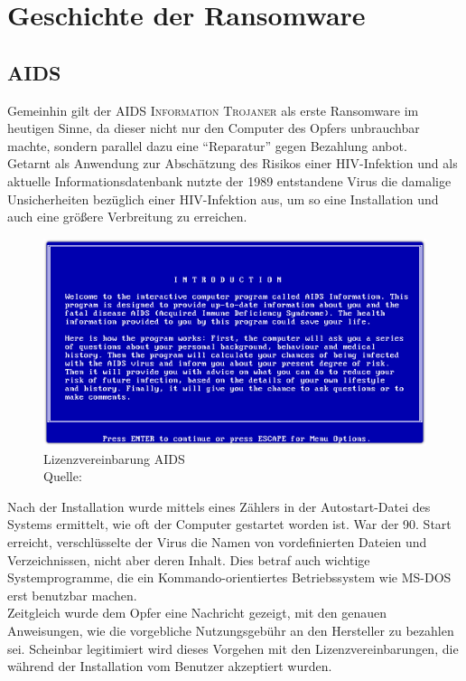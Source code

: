 \section{Geschichte der Ransomware}
\label{sec:geschichte}
	\subsection{AIDS}
		Gemeinhin gilt der \textsc{AIDS Information Trojaner} als erste Ransomware im heutigen Sinne, da dieser nicht nur den Computer des Opfers unbrauchbar machte, sondern
		parallel dazu eine "`Reparatur"' gegen Bezahlung anbot. \\
		Getarnt als Anwendung zur Abschätzung des Risikos einer HIV-Infektion und als aktuelle Informationsdatenbank nutzte der 1989 entstandene Virus die damalige
		Unsicherheiten bezüglich einer HIV-Infektion aus, um so eine Installation und auch eine größere Verbreitung zu erreichen. 
	\begin{figure}[h!]
		\centering
		\includegraphics[width=\linewidth]{img/aids1.png}
		\caption{Lizenzvereinbarung AIDS \\ Quelle: \cite{aids:sophos}}
		\label{fig:lizenz_aids}
	\end{figure}

		Nach der Installation wurde mittels eines Zählers in der Autostart-Datei des Systems ermittelt, wie oft der Computer gestartet worden ist. War der 90. Start 
		erreicht, verschlüsselte der Virus die Namen von vordefinierten Dateien und Verzeichnissen, nicht aber deren Inhalt. Dies betraf auch wichtige Systemprogramme, die 
		ein Kommando-orientiertes Betriebssystem wie MS-DOS erst benutzbar machen. \\
		Zeitgleich wurde dem Opfer eine Nachricht gezeigt, mit den genauen Anweisungen, wie die vorgebliche Nutzungsgebühr an den Hersteller zu bezahlen sei. 
		Scheinbar legitimiert wird dieses Vorgehen mit den Lizenzvereinbarungen, die während der Installation vom Benutzer akzeptiert wurden. 

